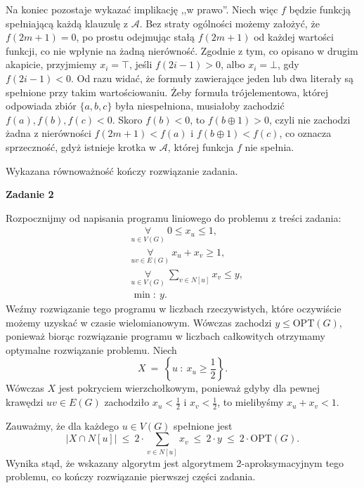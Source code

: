 \documentclass[12pt]{article}
\begin{document}
	\medskip
	
	Na koniec pozostaje wykazać implikację ,,w prawo''. Niech więc \(f\) będzie
	funkcją spełniającą każdą klauzulę z \(\mathcal{A}\). Bez straty ogólności
	możemy założyć, że \(f(2m + 1) = 0\), po prostu odejmując stałą \(f(2m +
	1)\) od każdej wartości funkcji, co nie wpłynie na żadną nierówność. Zgodnie
	z tym, co opisano w drugim akapicie, przyjmiemy \(x_{i} = \top\), jeśli
	\(f(2i - 1) > 0\), albo \(x_{i} = \bot\), gdy \(f(2i - 1) < 0\). Od razu
	widać, że formuły zawierające jeden lub dwa literały są spełnione przy takim
	wartościowaniu. Żeby formuła trójelementowa, której odpowiada zbiór \(\{a,
	b, c\}\) była niespełniona, musiałoby zachodzić \(f(a), f(b), f(c) < 0\).
	Skoro \(f(b) < 0\), to \(f(b \oplus 1) > 0\), czyli nie zachodzi żadna z
	nierówności \(f(2m + 1) < f(a)\) i \(f(b \oplus 1) < f(c)\), co oznacza
	sprzeczność, gdyż istnieje krotka w \(\mathcal{A}\), której funkcja \(f\)
	nie spełnia.
	
	\medskip
	
	Wykazana równoważność kończy rozwiązanie zadania.
	
	\newpage
	
	\textbf{Zadanie 2}
	
	\medskip
	
	Rozpocznijmy od napisania programu liniowego do problemu z treści zadania:
	\begin{align*}
		&\underset{u \in V(G)}{\forall} \ 0 \leqslant x_{u} \leqslant 1
		\text{,} \\
		&\underset{uv \in E(G)}{\forall} \ x_{u} + x_{v} \geqslant 1 \text{,} \\
		&\underset{u \in V(G)}{\forall} \ \sum\limits_{v \in N[u]} x_{v}
		\leqslant y \text{,} \\
		&\min\!: \ y \text{.}
	\end{align*}
	Weźmy rozwiązanie tego programu w liczbach rzeczywistych, które oczywiście
	możemy uzyskać w czasie wielomianowym. Wówczas zachodzi \(y \leqslant
	\text{OPT}(G)\), ponieważ biorąc rozwiązanie programu w liczbach całkowitych
	otrzymamy optymalne rozwiązanie problemu. Niech
	\[ X \ = \ \left\{ u \ : \ x_{u} \geqslant \frac{1}{2} \right\} \text{.} \]
	Wówczas \(X\) jest pokryciem wierzchołkowym, ponieważ gdyby dla pewnej
	krawędzi \(uv \in E(G)\) zachodziło \(x_{u} < \frac{1}{2}\) i \(x_{v} <
	\frac{1}{2}\), to mielibyśmy \(x_{u} + x_{v} < 1\).
	
	\medskip
	
	Zauważmy, że dla każdego \(u \in V(G)\) spełnione jest
	\begin{equation}
		|X \cap N[u]| \ \leqslant \ 2 \cdot \sum\limits_{v \in N[u]} x_{v} \
		\leqslant \ 2 \cdot y \ \leqslant \ 2 \cdot \text{OPT}(G) \text{.}
		\tag{*} \label{eq:star}
	\end{equation}
	Wynika stąd, że wskazany algorytm jest algorytmem 2-aproksymacyjnym tego
	problemu, co kończy rozwiązanie pierwszej części zadania.
	
\end{document}
